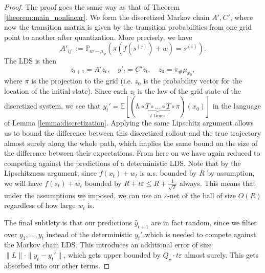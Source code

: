 \documentclass[11pt]{article}
\def\epsilon{\varepsilon}
\numberwithin{equation}{section}
\begin{document}
 \begin{proof}
     The proof goes the same way as that of Theorem \ref{theorem:main_nonlinear}. We form the discretized Markov chain $A', C'$, where now the transition matrix is given by the transition probabilities from one grid point to another after quantization. More precisely, we have
     $$A'_{ij}\;:= \mathbb{P}_{w \sim \mu_w }\left(\pi\left(f(s^{(j)})+w\right)=s^{(i)}\right).$$
     The LDS is then
     $$z_{t+1} = A'z_t, \quad y'_t = C'z_t, \quad z_0 = \pi_\# \mu_{x_0} ,$$
     where $\pi$ is the projection to the grid (i.e. $z_0$ is the probability vector for the location of the initial state). Since each $z_t$ is the law of the grid state of the discretized system, we see that $y_t' = \mathbb{E}[(h \circ \underbrace{ T \circ \ldots \circ T}_{\text{$t$ times}} \circ \pi)(x_0)]$ in the language of Lemma \ref{lemma:discretization}. Applying the same Lipschitz argument allows us to bound the difference between this discretized rollout and the true trajectory almost surely along the whole path, which implies the same bound on the size of the difference between their expectations. From here on we have again reduced to competing against the predictions of a deterministic LDS. Note that by the Lipschitzness argument, since $f(x_t) + w_t$ is a.s. bounded by $R$ by assumption, we will have $f(s_t) + w_t$ bounded by $R + t\epsilon \leq R + \frac{1}{\sqrt{T}}$ always. This means that under the assumptions we imposed, we can use an $\epsilon$-net of the ball of size $O(R)$ regardless of how large $w_t$ is. 

     The final subtlety is that our predictions $\hat{y}_{t+1}$ are in fact random, since we filter over $y_1, \ldots, y_t$ instead of the deterministic $y_t'$ which is needed to compete against the Markov chain LDS. This introduces an additional error of size $\|L\| \cdot \|y_t - y_t'\|$, which gets upper bounded by $Q_\star \cdot t\epsilon$ almost surely. This gets absorbed into our other terms.
 \end{proof}
\end{document}
